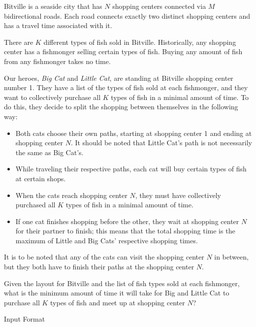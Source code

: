 \documentclass[12pt]{article}
\begin{document}
\smallskip \smallskip \noindent
Bitville is a seaside city that has $N$ shopping centers connected via
$M$ bidirectional roads. Each road connects exactly two distinct shopping
centers and has a travel time associated with it.

\smallskip \smallskip \noindent
There are $K$ different types of fish sold in Bitville. Historically, any
shopping center has a fishmonger selling certain types of fish. Buying
any amount of fish from any fishmonger takes no time.

\smallskip \smallskip \noindent
Our heroes, {\it Big Cat} and {\it Little Cat}, are standing at
Bitville shopping center number 1. They have a list of the types of
fish sold at each fishmonger, and they want to collectively purchase
all $K$ types of fish in a minimal amount of time. To do this, they
decide to split the shopping between themselves in the following way:

\begin{itemize}
\item{Both cats choose their own paths, starting at shopping center
1 and ending at shopping center $N$. It should be noted that Little Cat's
path is not necessarily the same as Big Cat's.}

\item{While traveling their respective paths, each cat will buy certain types of fish at certain shops.}  

\item{When the cats reach shopping center $N$, they must have
collectively purchased all $K$ types of fish in a minimal amount of time.}

\item{If one cat finishes shopping before the other, they wait at shopping
center $N$ for their partner to finish; this means that the total shopping
time is the maximum of Little and Big Cats' respective shopping times.}
\end{itemize}

\smallskip \smallskip \noindent
It is to be noted that any of the cats can visit the shopping center
$N$ in between, but they both have to finish their paths at the
shopping center $N$.

\smallskip \smallskip \noindent
Given the layout for Bitville and the list of fish types sold at each
fishmonger, what is the minimum amount of time it will take for Big
and Little Cat to purchase all $K$ types of fish and meet up at shopping
center $N$?


Input Format
\end{document}
